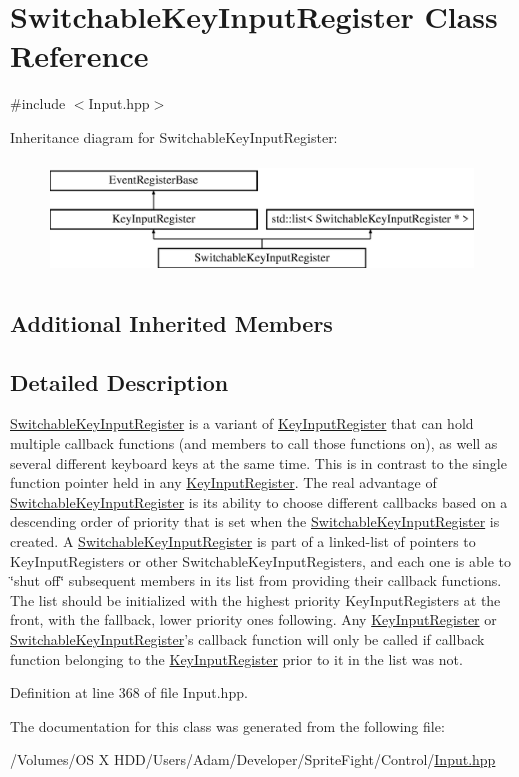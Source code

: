 \hypertarget{class_switchable_key_input_register}{\section{Switchable\-Key\-Input\-Register Class Reference}
\label{class_switchable_key_input_register}
}


{\ttfamily \#include $<$Input.\-hpp$>$}

Inheritance diagram for Switchable\-Key\-Input\-Register\-:\begin{figure}[H]
\begin{center}
\leavevmode
\includegraphics[height=3.000000cm]{class_switchable_key_input_register}
\end{center}
\end{figure}
\subsection*{Additional Inherited Members}


\subsection{Detailed Description}
\hyperlink{class_switchable_key_input_register}{Switchable\-Key\-Input\-Register} is a variant of \hyperlink{class_key_input_register}{Key\-Input\-Register} that can hold multiple callback functions (and members to call those functions on), as well as several different keyboard keys at the same time. This is in contrast to the single function pointer held in any \hyperlink{class_key_input_register}{Key\-Input\-Register}. The real advantage of \hyperlink{class_switchable_key_input_register}{Switchable\-Key\-Input\-Register} is its ability to choose different callbacks based on a descending order of priority that is set when the \hyperlink{class_switchable_key_input_register}{Switchable\-Key\-Input\-Register} is created. A \hyperlink{class_switchable_key_input_register}{Switchable\-Key\-Input\-Register} is part of a linked-\/list of pointers to Key\-Input\-Registers or other Switchable\-Key\-Input\-Registers, and each one is able to \char`\"{}shut off\char`\"{} subsequent members in its list from providing their callback functions. The list should be initialized with the highest priority Key\-Input\-Registers at the front, with the fallback, lower priority ones following. Any \hyperlink{class_key_input_register}{Key\-Input\-Register} or \hyperlink{class_switchable_key_input_register}{Switchable\-Key\-Input\-Register}'s callback function will only be called if callback function belonging to the \hyperlink{class_key_input_register}{Key\-Input\-Register} prior to it in the list was not. 

Definition at line 368 of file Input.\-hpp.



The documentation for this class was generated from the following file\-:\begin{DoxyCompactItemize}
\item 
/\-Volumes/\-O\-S X H\-D\-D/\-Users/\-Adam/\-Developer/\-Sprite\-Fight/\-Control/\hyperlink{_input_8hpp}{Input.\-hpp}\end{DoxyCompactItemize}

